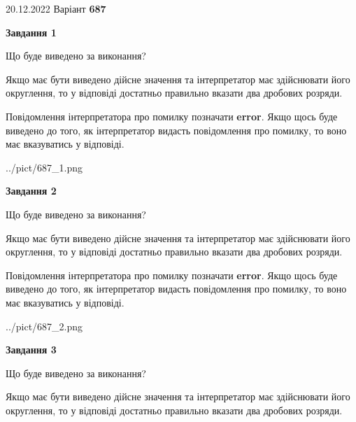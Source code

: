 \documentclass[12pt, ukrainian]{article}
\begin{document}
{20.12.2022 Варіант \No \textbf { 687 }\par}
{
\begin {Large}

{\begin {center}\textbf{Завдання 1}\end {center}}\par
Що буде виведено за виконання? \par

Якщо має бути виведено дійсне значення та інтерпретатор має здійснювати його округлення, 
то у відповіді достатньо правильно вказати два дробових розряди.

Повідомлення інтерпретатора про помилку позначати \textbf{error}.
Якщо щось буде виведено до того, як інтерпретатор видасть повідомлення про помилку, 
то воно має вказуватись у відповіді. \par

\begin{center}
	{../pict/687_1.png}
\end{center}
\newpage

{\begin {center}\textbf{Завдання 2}\end {center}}\par
Що буде виведено за виконання? \par

Якщо має бути виведено дійсне значення та інтерпретатор має здійснювати його округлення, 
то у відповіді достатньо правильно вказати два дробових розряди.

Повідомлення інтерпретатора про помилку позначати \textbf{error}.
Якщо щось буде виведено до того, як інтерпретатор видасть повідомлення про помилку, 
то воно має вказуватись у відповіді. \par

\begin{center}
	{../pict/687_2.png}
\end{center}
\newpage

{\begin {center}\textbf{Завдання 3}\end {center}}\par
Що буде виведено за виконання? \par

Якщо має бути виведено дійсне значення та інтерпретатор має здійснювати його округлення, 
то у відповіді достатньо правильно вказати два дробових розряди.


\end{Large}}
\end{document}

